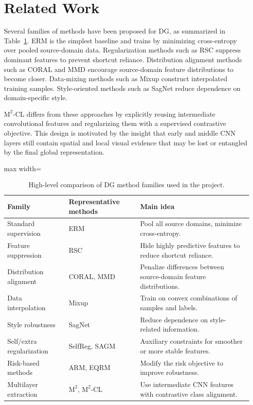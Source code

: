 \documentclass[11pt,a4paper]{article}
\newcommand{\method}{\texorpdfstring{$\mathrm{M}^2$\textup{-CL}}{M2-CL}}
\newcommand{\base}{\texorpdfstring{$\mathrm{M}^2$}{M2}}
\begin{document}
\section{Related Work}

Several families of methods have been proposed for DG, as summarized in
Table~\ref{tab:method_families}.  ERM is the simplest baseline and trains by
minimizing cross-entropy over pooled source-domain data.  Regularization methods
such as RSC suppress dominant features to prevent shortcut reliance.  Distribution
alignment methods such as CORAL and MMD encourage source-domain feature
distributions to become closer.  Data-mixing methods such as Mixup construct
interpolated training samples.  Style-oriented methods such as SagNet reduce
dependence on domain-specific style.

\method{} differs from these approaches by explicitly reusing intermediate
convolutional features and regularizing them with a supervised contrastive
objective.  This design is motivated by the insight that early and middle CNN
layers still contain spatial and local visual evidence that may be lost or
entangled by the final global representation.

\begin{table}[H]
\centering
\caption{High-level comparison of DG method families used in the project.}
\label{tab:method_families}
\small
\begin{adjustbox}{max width=\textwidth}
\begin{tabular}{lll}
\toprule
\rowcolor{headerblue}
Family & Representative methods & Main idea \\
\midrule
Standard supervision   & ERM         & Pool all source domains, minimize cross-entropy. \\
Feature suppression    & RSC         & Hide highly predictive features to reduce shortcut reliance. \\
Distribution alignment & CORAL, MMD  & Penalize differences between source-domain feature distributions. \\
Data interpolation     & Mixup       & Train on convex combinations of samples and labels. \\
Style robustness       & SagNet      & Reduce dependence on style-related information. \\
Self/extra regularization & SelfReg, SAGM & Auxiliary constraints for smoother or more stable features. \\
Risk-based methods     & ARM, EQRM   & Modify the risk objective to improve robustness. \\
Multilayer extraction  & \base{}, \method{} & Use intermediate CNN features with contrastive class alignment. \\
\bottomrule
\end{tabular}
\end{adjustbox}
\end{table}
\end{document}
